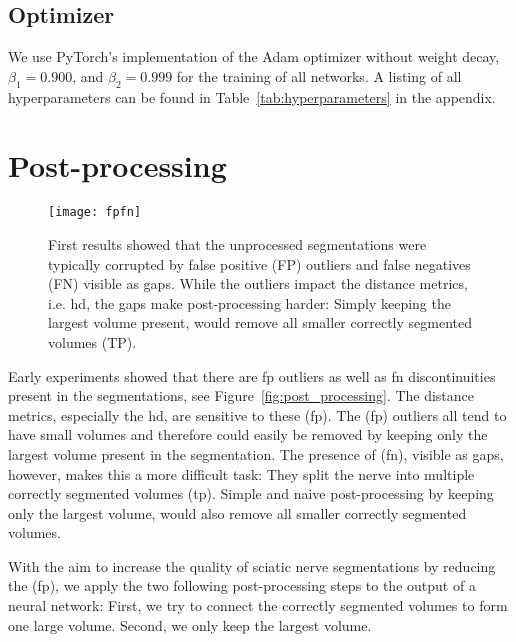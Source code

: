 \subsection{Optimizer}
We use PyTorch's implementation of the Adam optimizer \cite{Kingma2014Adam:Optimization} without weight decay, $\beta_1 = 0.900$, and $\beta_2 = 0.999$ for the training of all networks. A listing of all hyperparameters can be found in Table~\ref{tab:hyperparameters} in the appendix.

\section{Post-processing} \label{sec:postprocessing}
\begin{figure}[htbp]
    \centering
	\texttt{[image: fpfn]}
    \caption[Segmentation Issues]{First results showed that the unprocessed segmentations were typically corrupted by false positive (FP) outliers and false negatives (FN) visible as gaps. While the outliers impact the distance metrics, i.e. \acrlong{hd}, the gaps make post-processing harder: Simply keeping the largest volume present, would remove all smaller correctly segmented volumes (TP).}
    \label{fig:fpfn}
\end{figure}
Early experiments showed that there are \gls{fp} outliers as well as \gls{fn} discontinuities present in the segmentations, see Figure~\ref{fig:post_processing}. The distance metrics, especially the \acrshort{hd}, are sensitive to these (\acrshort{fp}). The (\acrshort{fp}) outliers all tend to have small volumes and therefore could easily be removed by keeping only the largest volume present in the segmentation. The presence of (\acrshort{fn}), visible as gaps, however, makes this a more difficult task: They split the nerve into multiple correctly segmented volumes (\acrshort{tp}). Simple and naive post-processing by keeping only the largest volume, would also remove all smaller correctly segmented volumes.

With the aim to increase the quality of sciatic nerve segmentations by reducing the (\acrshort{fp}), we apply the two following post-processing steps to the output of a neural network: First, we try to connect the correctly segmented volumes to form one large volume. Second, we only keep the largest volume.

